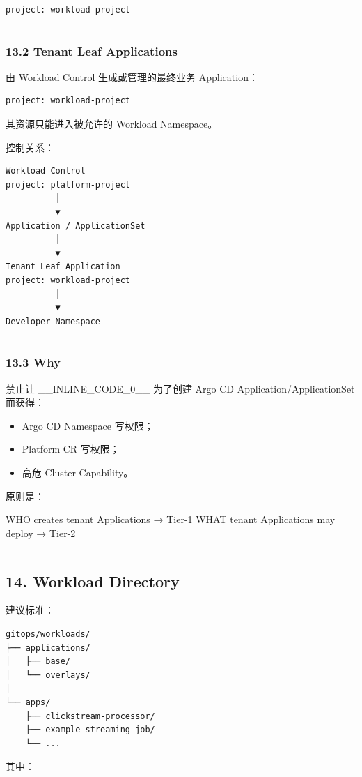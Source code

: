 \documentclass[11pt,a4paper]{article}
\begin{document}
\begin{lstlisting}[language=text]
project: workload-project
\end{lstlisting}
\vspace{0.5em}\hrule\vspace{0.5em}
\subsubsection{13.2 Tenant Leaf Applications}
由 Workload Control 生成或管理的最终业务 Application：

\begin{lstlisting}[language=text]
project: workload-project
\end{lstlisting}
其资源只能进入被允许的 Workload Namespace。

控制关系：

\begin{lstlisting}[language=text]
Workload Control
project: platform-project
          │
          ▼
Application / ApplicationSet
          │
          ▼
Tenant Leaf Application
project: workload-project
          │
          ▼
Developer Namespace
\end{lstlisting}
\vspace{0.5em}\hrule\vspace{0.5em}
\subsubsection{13.3 Why}
禁止让 \_\_INLINE\_CODE\_0\_\_ 为了创建 Argo CD Application/ApplicationSet 而获得：

\begin{itemize}
  \item Argo CD Namespace 写权限；
  \item Platform CR 写权限；
  \item 高危 Cluster Capability。
\end{itemize}
原则是：

\begin{gfmBlockquote}
WHO creates tenant Applications → Tier-1
WHAT tenant Applications may deploy → Tier-2
\end{gfmBlockquote}
\vspace{0.5em}\hrule\vspace{0.5em}
\subsection{14. Workload Directory}
建议标准：

\begin{lstlisting}[language=text]
gitops/workloads/
├── applications/
│   ├── base/
│   └── overlays/
│
└── apps/
    ├── clickstream-processor/
    ├── example-streaming-job/
    └── ...
\end{lstlisting}
其中：
\end{document}
